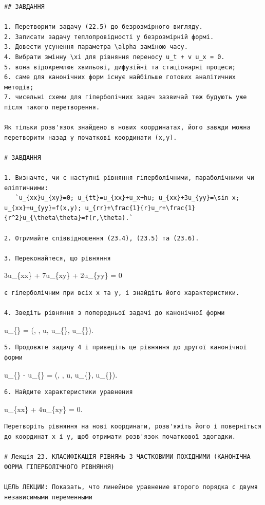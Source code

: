 \documentclass[
  ukrainian,
]{article}
\begin{document}
\begin{verbatim}
## ЗАВДАННЯ

1. Перетворити задачу (22.5) до безрозмірного вигляду.
2. Записати задачу теплопровідності у безрозмірній формі.
3. Довести усунення параметра \alpha заміною часу.
4. Вибрати змінну \xi для рівняння переносу u_t + v u_x = 0.
5. вона відокремлює хвильові, дифузійні та стаціонарні процеси;
6. саме для канонічних форм існує найбільше готових аналітичних методів;
7. чисельні схеми для гіперболічних задач зазвичай теж будують уже після такого перетворення.

Як тільки розв'язок знайдено в нових координатах, його завжди можна перетворити назад у початкові координати (x,y).

# ЗАВДАННЯ

1. Визначте, чи є наступні рівняння гіперболічними, параболічними чи еліптичними:
   `u_{xx}u_{xy}=0; u_{tt}=u_{xx}+u_x+hu; u_{xx}+3u_{yy}=\sin x; u_{xx}+u_{yy}=f(x,y); u_{rr}+\frac{1}{r}u_r+\frac{1}{r^2}u_{\theta\theta}=f(r,\theta).`

2. Отримайте співвідношення (23.4), (23.5) та (23.6).

3. Переконайтеся, що рівняння
\end{verbatim}

3u\_\{xx\} + 7u\_\{xy\} + 2u\_\{yy\} = 0

\begin{verbatim}
є гіперболічним при всіх x та y, і знайдіть його характеристики.

4. Зведіть рівняння з попередньої задачі до канонічної форми
\end{verbatim}

u\_\{\xi\eta\} = \Phi(\xi, \eta, u, u\_\{\xi\}, u\_\{\eta\}).

\begin{verbatim}
5. Продовжте задачу 4 і приведіть це рівняння до другої канонічної форми
\end{verbatim}

u\_\{\alpha\alpha\} - u\_\{\beta\beta\} = \Psi(\alpha, \beta, u,
u\_\{\alpha\}, u\_\{\beta\}).

\begin{verbatim}
6. Найдите характеристики уравнения
\end{verbatim}

u\_\{xx\} + 4u\_\{xy\} = 0.

\begin{verbatim}
Перетворіть рівняння на нові координати, розв'яжіть його і поверніться до координат x і y, щоб отримати розв'язок початкової здогадки.

# Лекція 23. КЛАСИФІКАЦІЯ РІВНЯНЬ З ЧАСТКОВИМИ ПОХІДНИМИ (КАНОНІЧНА ФОРМА ГІПЕРБОЛІЧНОГО РІВНЯННЯ)

ЦЕЛЬ ЛЕКЦИИ: Показать, что линейное уравнение второго порядка с двумя независимыми переменными
\end{verbatim}
\end{document}
